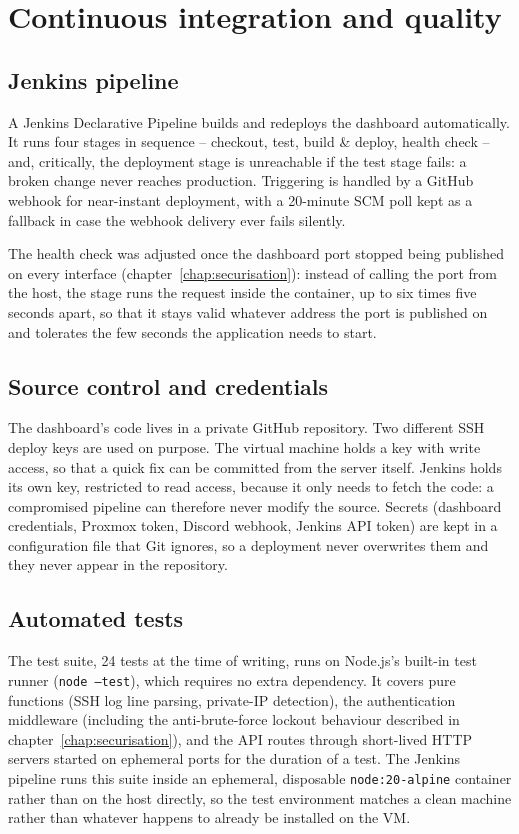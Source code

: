 \chapter{Continuous integration and quality}
\label{chap:cicd}

\section{Jenkins pipeline}
A Jenkins Declarative Pipeline builds and redeploys the dashboard automatically. It runs four stages in sequence -- checkout, test, build \& deploy, health check -- and, critically, the deployment stage is unreachable if the test stage fails: a broken change never reaches production. Triggering is handled by a GitHub webhook for near-instant deployment, with a 20-minute SCM poll kept as a fallback in case the webhook delivery ever fails silently.

The health check was adjusted once the dashboard port stopped being published on every interface (chapter~\ref{chap:securisation}): instead of calling the port from the host, the stage runs the request inside the container, up to six times five seconds apart, so that it stays valid whatever address the port is published on and tolerates the few seconds the application needs to start.

\section{Source control and credentials}
The dashboard's code lives in a private GitHub repository. Two different SSH deploy keys are used on purpose. The virtual machine holds a key with write access, so that a quick fix can be committed from the server itself. Jenkins holds its own key, restricted to read access, because it only needs to fetch the code: a compromised pipeline can therefore never modify the source. Secrets (dashboard credentials, Proxmox token, Discord webhook, Jenkins API token) are kept in a configuration file that Git ignores, so a deployment never overwrites them and they never appear in the repository.

\section{Automated tests}
The test suite, 24 tests at the time of writing, runs on Node.js's built-in test runner (\texttt{node --test}), which requires no extra dependency. It covers pure functions (SSH log line parsing, private-IP detection), the authentication middleware (including the anti-brute-force lockout behaviour described in chapter~\ref{chap:securisation}), and the API routes through short-lived HTTP servers started on ephemeral ports for the duration of a test. The Jenkins pipeline runs this suite inside an ephemeral, disposable \texttt{node:20-alpine} container rather than on the host directly, so the test environment matches a clean machine rather than whatever happens to already be installed on the VM.


